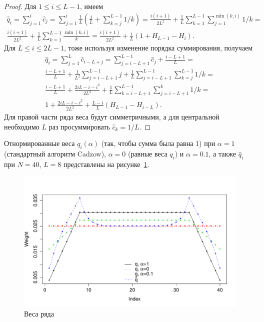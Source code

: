 \documentclass[12pt,a4paper,fleqn,leqno]{article}
\begin{document}
\begin{proof}
Для $1 \le i \le L-1$, имеем
\begin{gather*}
\hat{q}_i = \sum_{j=1}^i \hat{c}_j = \sum_{j=1}^i \frac{1}{L}\left(\frac{j}{L} + \sum_{k=j}^{L-1}1/k\right) = 
\frac{i(i+1)}{2L^2}+\frac{1}{L} \sum_{k = 1}^{L-1} \sum_{j=1}^{\min(k,i)} 1/k =\\ \frac{i(i+1)}{2L^2}+\frac{1}{L} \sum_{k = 1}^{L-1} \frac{\min(k,i)}{k} = \frac{i(i+1)}{2 L^2} + \frac{i}{L}(1 + H_{L-1} - H_i).
\end{gather*}
Для $L \le i \le 2L-1$, тоже используя изменение порядка суммирования, получаем
\begin{gather*}
\hat{q}_i = \sum_{j = 1}^L \hat{c}_{i-L+j} = \sum_{j = i - L + 1}^{L - 1} \hat{c}_j + \frac{i - L + 1}{L} =\\
\frac{i - L + 1}{L} + \frac{1}{L^2} \sum_{j = i - L + 1}^{L-1}j + \frac{1}{L} \sum_{j = i-L + 1}^{L-1} \sum_{k=j}^{L-1}1/k =\\ \frac{i - L + 1}{L} + \frac{2iL - i - i^2}{2L^2} + \frac{1}{L} \sum_{k = i - L + 1}^{L - 1} \sum_{j = i - L + 1}^k 1/k =\\
1 + \frac{2iL-i-i^2}{2L^2} + \frac{L-i}{L}(H_{L-1} - H_{i - L}).
\end{gather*}
Для правой части ряда веса будут симметричными, а для центральной необходимо $L$ раз просуммировать $\hat{c}_k = 1/L$.
\end{proof}

Отнормированные веса $q_i(\alpha)$ (так, чтобы сумма была равна 1) при $\alpha = 1$ (стандартный алгоритм Cadzow), $\alpha = 0$ (равные веса $q_i$) и $\alpha = 0.1$,
 а также $\hat{q}_i$ при $N = 40$, $L = 8$ представлены на рисунке~\ref{img_weights}.
\begin{figure}[!h] \begin{center}
\includegraphics[width = 15cm]{weights.pdf}\caption{Веса ряда}\label{img_weights}
\end{center}\end{figure}
\end{document}
